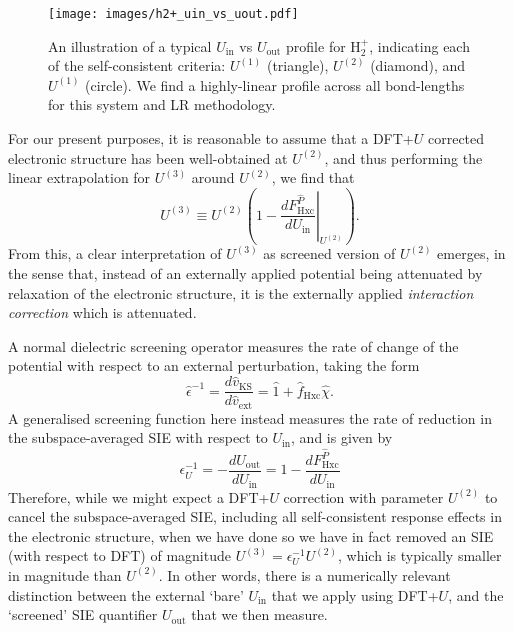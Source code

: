 %
\begin{figure}[th!]
\centering
\texttt{[image: images/h2+\_uin\_vs\_uout.pdf]}
\caption[Example of $U_\textrm{in}$ vs $U_\textrm{out}$ profile for H$_2^+$]
{An illustration of a typical 
$U_\textrm{in}$ vs $U_\textrm{out}$ 
profile for H$_2^+$, 
indicating each of the self-consistent criteria:
$U^{(1)}$ (triangle), 
$U^{(2)}$ (diamond), 
and $U^{(1)}$ (circle).
%
We find a highly-linear profile across 
all bond-lengths for this system 
and LR methodology.}
\label{fig:h2+_uin_vs_uout}
\end{figure}
%



For our present purposes, it is reasonable to assume that 
a DFT+$U$ corrected electronic structure has been well-obtained 
at $U^{(2)}$, and thus performing the 
linear extrapolation for $U^{(3)}$ around  $U^{(2)}$, 
we find that
\begin{equation}
U^{(3)}\equiv U^{(2)} \left(1-  \left. \frac{d F^{\hat{P}}_\textrm{Hxc} }{ dU_\textrm{in}  } \right|_{U^{(2)}} \right).
\end{equation} 
%
From this, a clear interpretation of
$U^{(3)}$ as screened version of $U^{(2)}$ emerges,  
in the sense that, 
instead of an externally applied potential 
being attenuated by relaxation of the electronic structure, 
it is the externally applied \emph{interaction correction}
which is attenuated.

A normal dielectric screening operator 
measures the rate of change of 
the potential with respect to an external perturbation, taking 
the form 
%
\begin{equation}
\hat{\epsilon}^{-1}= \frac{d\hat{v}_\textrm{KS}}{d\hat{v}_\textrm{ext}} 
= \hat{1}+ \hat{f}_\textrm{Hxc} \hat{\chi}.
\end{equation}
%
A generalised screening function here instead  
measures the rate of reduction in the subspace-averaged
SIE with respect to $U_\textrm{in}$, and is given by
%
\begin{equation}
\epsilon_U^{-1}= - \frac{dU_\textrm{out}}{dU_\textrm{in}} = 1-\frac{dF^{\hat{P}}_\textrm{Hxc}}{dU_\textrm{in}}
\end{equation}
%
Therefore, while we might expect a DFT+$U$
correction with parameter $U^{(2)}$
to  cancel the subspace-averaged SIE, 
including all  self-consistent
response effects in the electronic structure, 
when we have done so we have 
in fact removed an SIE (with respect to DFT) 
of magnitude $U^{(3)}= \epsilon_U^{-1} U^{(2)}$, 
which is typically smaller in magnitude than $U^{(2)}$.
%
In other words, 
there is a numerically relevant 
 distinction between the external `bare'  $U_\textrm{in}$ 
that we  apply using DFT+$U$,  and the `screened' SIE quantifier 
$U_\textrm{out}$ that we then measure.


